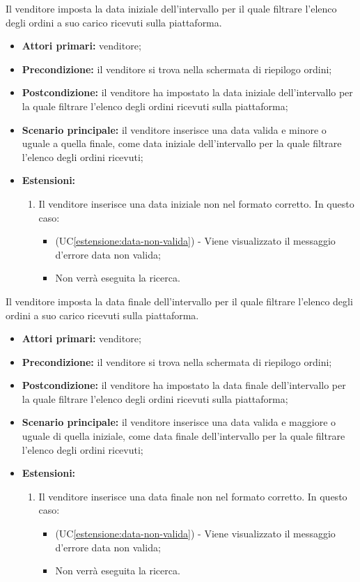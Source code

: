 Il venditore imposta la data iniziale dell'intervallo per il quale filtrare l'elenco degli ordini a suo carico ricevuti sulla piattaforma.
\begin{itemize}
	\item \textbf{Attori primari:} venditore;
	\item \textbf{Precondizione:} il venditore si trova nella schermata di riepilogo ordini;
	\item \textbf{Postcondizione:} il venditore ha impostato la data iniziale dell'intervallo per la quale filtrare l'elenco degli ordini ricevuti sulla piattaforma;
	\item \textbf{Scenario principale:} il venditore inserisce una data valida e minore o uguale a quella finale, come data iniziale dell'intervallo per la quale filtrare l'elenco degli ordini ricevuti;
	\item \textbf{Estensioni:}
	\begin{enumerate}[label=\lett]
		\item Il venditore inserisce una data iniziale non nel formato corretto. In questo caso:
		\begin{itemize}
			\item (UC\ref{estensione:data-non-valida}) - Viene visualizzato il messaggio d'errore data non valida;
			\item Non verrà eseguita la ricerca.
		\end{itemize} 
	\end{enumerate}
\end{itemize}

\label{filtro-ordini-venditore.temporale.data-finale}

Il venditore imposta la data finale dell'intervallo per il quale filtrare l'elenco degli ordini a suo carico ricevuti sulla piattaforma.
\begin{itemize}
	\item \textbf{Attori primari:} venditore;
	\item \textbf{Precondizione:} il venditore si trova nella schermata di riepilogo ordini;
	\item \textbf{Postcondizione:} il venditore ha impostato la data finale dell'intervallo per la quale filtrare l'elenco degli ordini ricevuti sulla piattaforma;
	\item \textbf{Scenario principale:} il venditore inserisce una data valida e maggiore o uguale di quella iniziale, come data finale dell'intervallo per la quale filtrare l'elenco degli ordini ricevuti;
	\item \textbf{Estensioni:}
	\begin{enumerate}[label=\lett]
		\item Il venditore inserisce una data finale non nel formato corretto. In questo caso:
		\begin{itemize}
			\item (UC\ref{estensione:data-non-valida}) - Viene visualizzato il messaggio d'errore data non valida;
			\item Non verrà eseguita la ricerca.
		\end{itemize}
	\end{enumerate}
\end{itemize}